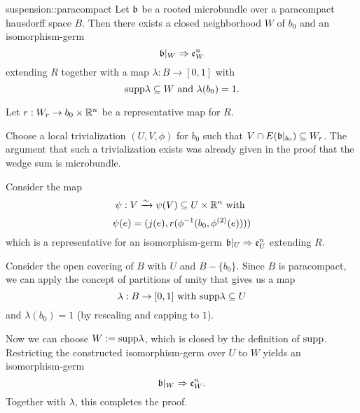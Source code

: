 \begin{mylemma}{suspension::paracompact}
    Let $\mathfrak{b}$ be a rooted microbundle over a paracompact hausdorff space $B$.
    Then there exists a closed neighborhood $W$ of $b_0$ and an isomorphism-germ
    \[ \mathfrak{b}\vert_{W} \Rightarrow{} \mathfrak{e}^{n}_W \]
    extending $R$ together with a map $\lambda: B \to [0, 1]$ with
    \[ \text{supp}{\lambda} \subseteq{} W \text{ and } \lambda(b_0) = 1. \]
\end{mylemma}

\begin{myproof}
    Let $r: W_r \to b_0 \times \mathbb{R}^n$ be a representative map for $R$.
    
    Choose a local trivialization $(U, V, \phi)$ for $b_0$ such that $V \cap E(\mathfrak{b}\vert_{b_0}) \subseteq{} W_r$.
    The argument that such a trivialization exists was already given
    in the proof that the wedge sum is microbundle.

    Consider the map
    \[ \psi: V \xrightarrow{\sim} \psi(V) \subseteq{} U \times \mathbb{R}^n \text{ with } \]
    \[ \psi(e) = (j(e), r(\phi^{-1}(b_0, \phi^{(2)}(e)))) \]
    which is a representative for an isomorphism-germ $\mathfrak{b}\vert_{U} \Rightarrow{} \mathfrak{e}^{n}_U$ extending $R$.
    
    Consider the open covering of $B$ with $U$ and $B - \{b_0\}$.
    Since $B$ is paracompact, we can apply the concept
    of partitions of unity that gives us a map
    \[ \lambda: B \to [0, 1] \text{ with } \text{supp}{\lambda} \subseteq{} U \]
    and $\lambda(b_0) = 1$ (by rescaling and capping to $1$).

    Now we can choose $W := \text{supp}{\lambda}$, which is closed by the definition of $\text{supp}$.
    Restricting the constructed isomorphism-germ over $U$ to $W$
    yields an isomorphism-germ
    \[ \mathfrak{b}\vert_{W} \Rightarrow{} \mathfrak{e}^{n}_W. \]
    Together with $\lambda$, this completes the proof.
\end{myproof}